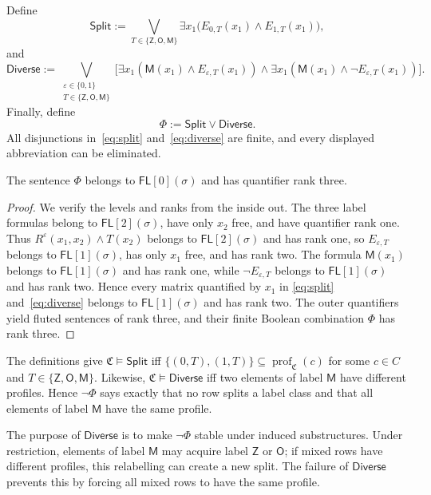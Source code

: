 \documentclass{lmcs}
\newcommand{\FL}{\mathsf{FL}}
\newcommand{\C}{\mathfrak{C}}
\newcommand{\Zt}{\mathsf{Z}}
\newcommand{\Ot}{\mathsf{O}}
\newcommand{\Mt}{\mathsf{M}}
\newcommand{\Types}{\{\Zt,\Ot,\Mt\}}
\newcommand{\prof}{\operatorname{prof}}
\begin{document}
Define
\begin{equation}
  \mathsf{Split}
  :=
  \bigvee_{T\in\Types}
  \exists x_1
  \bigl(E_{0,T}(x_1)\wedge E_{1,T}(x_1)\bigr),
  \label{eq:split}
\end{equation}
and
\begin{equation}
  \mathsf{Diverse}
  :=
  \bigvee_{\substack{\varepsilon\in\{0,1\}\\T\in\Types}}
  \bigl[\exists x_1(\Mt(x_1)\wedge E_{\varepsilon,T}(x_1))\wedge\exists x_1(\Mt(x_1)\wedge\neg E_{\varepsilon,T}(x_1))\bigr].
  \label{eq:diverse}
\end{equation}
Finally, define
\begin{equation}
  \Phi:=\mathsf{Split}\vee\mathsf{Diverse}.
  \label{eq:Phi}
\end{equation}
All disjunctions in~\eqref{eq:split} and~\eqref{eq:diverse} are finite, and every displayed abbreviation can be eliminated.

\begin{prop}
\label{prop:phi-syntax}
The sentence \(\Phi\) belongs to \(\FL[0](\sigma)\) and has quantifier rank
three.
\end{prop}

\begin{proof}
We verify the levels and ranks from the inside out.  The three label formulas
belong to \(\FL[2](\sigma)\), have only \(x_2\) free, and have quantifier rank one.
Thus \(R^\varepsilon(x_1,x_2)\wedge T(x_2)\) belongs to \(\FL[2](\sigma)\) and
has rank one, so \(E_{\varepsilon,T}\) belongs to \(\FL[1](\sigma)\), has only
\(x_1\) free, and has rank two.  The formula \(\Mt(x_1)\) belongs to
\(\FL[1](\sigma)\) and has rank one, while \(\neg E_{\varepsilon,T}\) belongs to
\(\FL[1](\sigma)\) and has rank two.  Hence every matrix quantified by \(x_1\) in
\eqref{eq:split} and~\eqref{eq:diverse} belongs to \(\FL[1](\sigma)\) and has
rank two.  The outer quantifiers yield fluted sentences of rank three, and
their finite Boolean combination \(\Phi\) has rank three.
\end{proof}

The definitions give \(\C\models\mathsf{Split}\) iff
\(\{(0,T),(1,T)\}\subseteq\prof_{\C}(c)\) for some \(c\in C\) and
\(T\in\Types\).  Likewise, \(\C\models\mathsf{Diverse}\) iff two elements of
label \(\Mt\) have different profiles.  Hence \(\neg\Phi\) says exactly that
no row splits a label class and that all elements of label \(\Mt\) have the
same profile.

The purpose of \(\mathsf{Diverse}\) is to make \(\neg\Phi\) stable under
induced substructures.  Under restriction, elements of label \(\Mt\) may
acquire label \(\Zt\) or \(\Ot\); if mixed rows have different profiles, this
relabelling can create a new split.  The failure of \(\mathsf{Diverse}\)
prevents this by forcing all mixed rows to have the same profile.
\end{document}
